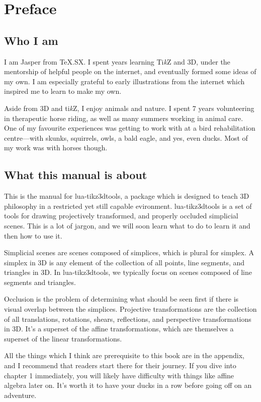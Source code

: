 \chapter{Preface}

\section{Who I am}

I am Jasper from \TeX{}.SX. I spent years learning Ti\textit{k}Z and 3D,
under the mentorship of helpful people on the internet, and eventually
formed some ideas of my own. I am especially grateful to early illustrations
from the internet which inspired me to learn to make my own.

Aside from 3D and ti\textit{k}Z, I enjoy animals and nature. I spent 
7 years volunteering in therapeutic horse riding, as well as many summers 
working in animal care. One of my favourite experiences was getting to
work with at a bird rehabilitation centre---with skunks, squirrels, owls, 
a bald eagle, and yes, even ducks. Most of my work was with horses though.

\section{What this manual is about}

This is the manual for lua-tikz3dtools, a package which is designed to 
teach 3D philosophy in a restricted yet still capable evironment.
lua-tikz3dtools is a set of tools for drawing projectively transformed,
and properly occluded simplicial scenes. This is a lot of jargon, and we 
will soon learn what to do to learn it and then how to use it.

Simplicial scenes are scenes composed of simplices, which is plural for 
simplex. A simplex in 3D is any element of the collection of all points,
line segments, and triangles in 3D. In lua-tikz3dtools, we typically 
focus on scenes composed of line segments and triangles.

Occlusion is the problem of determining what should be seen first if 
there is visual overlap between the simplices. Projective transformations
are the collection of all translations, rotations, shears, reflections,
and perspective transformations in 3D. It's a superset of the affine 
transformations, which are themselves a superset of the linear 
transformations.

All the things which I think are prerequisite to this book are in the 
appendix, and I recommend that readers start there for their journey.
If you dive into chapter 1 immediately, you will likely have difficulty
with things like affine algebra later on. It's worth it to have your ducks 
in a row before going off on an adventure.

